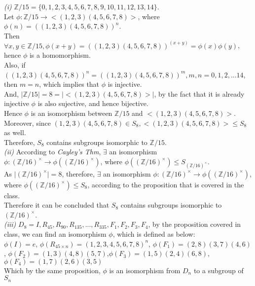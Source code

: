 \documentclass[11pt]{article}
\newcommand{\abs}[1]{\lvert #1 \rvert}
\newenvironment{problem}[2][Problem]{\begin{trivlist}
\item[\hskip \labelsep {\bfseries #1}\hskip \labelsep {\bfseries #2.}]}{\end{trivlist}}
\begin{document}
\begin{problem}{3}
\textit{(i)} $\mathbb{Z}/15 = \{0,1,2,3,4,5,6,7,8,9,10,11,12,13,14 \}$.\\
Let $\phi: \mathbb{Z}/15 \rightarrow <(1,2,3)(4,5,6,7,8)>$, where $ \phi(n) = ((1,2,3)(4,5,6,7,8))^n$.\\
Then $\forall x,y \in \mathbb{Z}/15, \phi(x+y) = ((1,2,3)(4,5,6,7,8))^(x+y)=\phi(x) \phi(y)$, hence $\phi$ is a homomorphism.\\
Also, if $((1,2,3)(4,5,6,7,8))^n = ((1,2,3)(4,5,6,7,8))^m, m,n = 0,1,2,...14$, then $m = n$, which implies that $\phi$ is injective.\\
And, $\abs{ \mathbb{Z}/15 } = 8 = \abs{<(1,2,3)(4,5,6,7,8)>}$, by the fact that it is already injective $\phi$ is also sujective, and hence bijective.\\
Hence $\phi$ is an isomorphism between $\mathbb{Z}/15$ and $<(1,2,3)(4,5,6,7,8)>$.\\
Moreover, since $(1,2,3)(4,5,6,7,8) \in S_8, <(1,2,3)(4,5,6,7,8)> \leq S_8$ as well.\\
Therefore, $S_8$ contains subgroups isomorphic to $\mathbb{Z}/15$.\\
\textit{(ii)} According to \textit{Cayley's Thm}, $\exists$ an isomorphism $\phi: (\mathbb{Z}/16)^{\times} \rightarrow \phi((\mathbb{Z}/16)^{\times})$,
where $\phi((\mathbb{Z}/16)^{\times}) \leq S_{(\mathbb{Z}/16)^{\times}}$.\\
As $\abs{(\mathbb{Z}/16)^{\times} }= 8$, therefore, $\exists$ an isomorphism $\phi: (\mathbb{Z}/16)^{\times} \rightarrow \phi((\mathbb{Z}/16)^{\times})$,
where $\phi((\mathbb{Z}/16)^{\times}) \leq S_{8}$, according to the proposition that is covered in the class.\\
Therefore it can be concluded that $S_8$ contains subgroups isomorphic to $(\mathbb{Z}/16)^{\times}$.\\
\textit{(iii)} $D_8 = {I,R_{45}, R_{90}, R_{135},...,R_{335},F_1,F_2,F_3,F_4}$, by the proposition covered in class, we can find an isomorphism $\phi$, which
is defined as below:\\
$\phi(I) = e$, $\phi(R_{45 \times n}) = (1,2,3,4,5,6,7,8)^n$, $\phi(F_1) = (2,8)(3,7)(4,6)$, $\phi(F_2) = (1,3)(4,8)(5,7)$,$\phi(F_3) = (1,5)(2,4)(6,8)$,$\phi(F_4) = (1,7)(2,6)(3,5)$\\
Which by the same proposition, $\phi$ is an isomorphism from $D_n$ to a subgroup of $S_n$\\
\end{problem}
\end{document}
